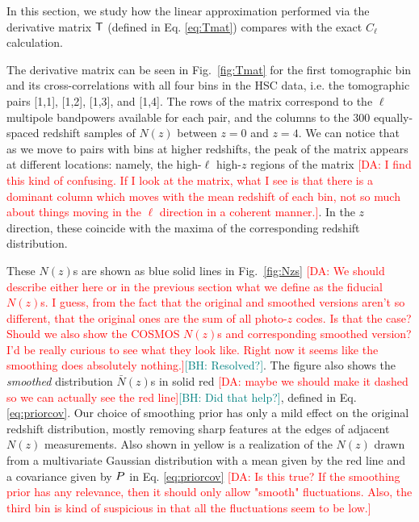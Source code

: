 \documentclass[a4paper,11pt]{article}
\newcommand{\da}[1]{{\textcolor{red}{[DA: #1]}}}
\newcommand{\bh}[1]{{\textcolor{teal}{[BH: #1]}}}
\begin{document}
      In this section, we study how the linear approximation performed via the derivative matrix ${\sf T}$ (defined in Eq. \ref{eq:Tmat}) compares with the exact $C_\ell$ calculation.
      
      The derivative matrix can be seen in Fig.~\ref{fig:Tmat} for the first tomographic bin and its cross-correlations with all four bins in the HSC data, i.e. the tomographic pairs [1,1], [1,2], [1,3], and [1,4]. The rows of the matrix correspond to the $\ell$ multipole bandpowers available for each pair, and the columns to the 300 equally-spaced redshift samples of $N(z)$ between $z = 0$ and $z = 4$. We can notice that as we move to pairs with bins at higher redshifts, the peak of the matrix appears at different locations: namely, the high-$\ell$ high-$z$ regions of the matrix \da{I find this kind of confusing. If I look at the matrix, what I see is that there is a dominant column  which moves with the mean redshift of each bin, not so much about things moving in the $\ell$ direction in a coherent manner.}. In the $z$ direction, these coincide with the maxima of the corresponding redshift distribution.
      
      These $N(z)$s are shown as blue solid lines in Fig.~\ref{fig:Nzs} \da{We should describe either here or in the previous section what we define as the fiducial $N(z)$s. I guess, from the fact that the original and smoothed versions aren't so different, that the original ones are the sum of all photo-$z$ codes. Is that the case? Should we also show the COSMOS $N(z)$s and corresponding smoothed version? I'd be really curious to see what they look like. Right now it seems like the smoothing does absolutely nothing.}\bh{Resolved?}. The figure also shows the {\sl smoothed} distribution $\bar{N}(z)$s in solid red \da{maybe we should make it dashed so we can actually see the red line}\bh{Did that help?}, defined in Eq. \ref{eq:priorcov}. Our choice of smoothing prior has only a mild effect on the original redshift distribution, mostly removing sharp features at the edges of adjacent $N(z)$ measurements. Also shown in yellow is a realization of the $N(z)$ drawn from a multivariate Gaussian distribution with a mean given by the red line and a covariance given by ${\sl P}$ in Eq. \ref{eq:priorcov} \da{Is this true? If the smoothing prior has any relevance, then it should only allow "smooth" fluctuations. Also, the third bin is kind of suspicious in that all the fluctuations seem to be low.}

      
\end{document}
